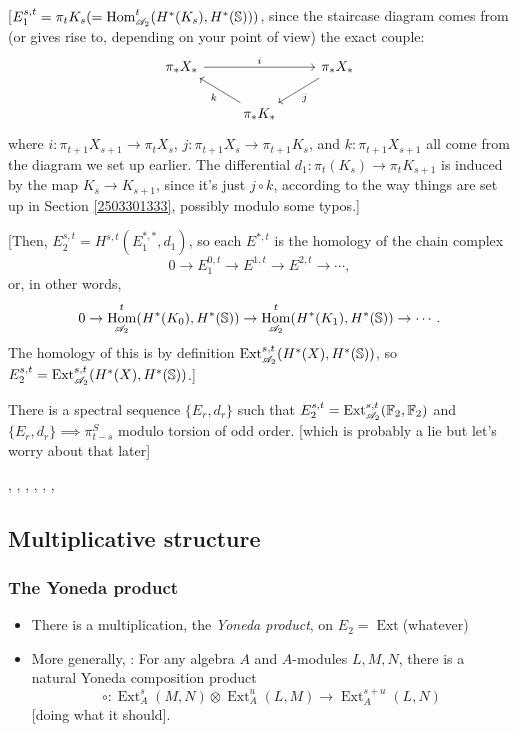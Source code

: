 \documentclass{MetricNotes2023}
\def\bb{\ensuremath\mathbb}
\def\A{\ensuremath{\mathscr{A}_2}}
\DeclareMathOperator{\Ext}{Ext}
\DeclareMathOperator{\Hom}{Hom}
\begin{document}
[\(E_1^{s,t} = \pi_t K_s (=\Hom^t_{\A}(H^*(K_s), H^*(\bb{S})))\), since the staircase diagram comes from (or gives rise to, depending on your point of view) the exact couple:
\[\begin{tikzcd}
 \pi_*X_* \arrow[rr, "i"] & & \pi_* X_* \arrow[dl, "j"] \\ 
 & \pi_*K_* \arrow[ul, "k"] & 
 \end{tikzcd}\]
where \(i : \pi_{t+1}X_{s+1}\to \pi_tX_s\), \(j : \pi_{t+1}X_s \to \pi_{t+1}K_s\), and \(k : \pi_{t+1}X_{s+1}\) all come from the diagram we set up earlier. The differential \(d_1 : \pi_t(K_s)\to\pi_t K_{s+1}\) is induced by the map \(K_s \to K_{s+1}\), since it's just \(j\circ k\), according to the way things are set up in Section \ref{2503301333}, possibly modulo some typos.]

[Then, \(E^{s,t}_2=H^{s,t}(E_1^{*,*}, d_1)\), so each \(E^{*, t}\) is the homology of the chain complex
\[0 \to E^{0,t}_1 \to E^{1,t}\to E^{2,t}\to \cdots,\]
or, in other words,
\[0 \to \Hom^t_{\A}(H^*(K_0), H^*(\bb{S}))\to \Hom^t_{\A}(H^*(K_1), H^*(\bb{S}))\to \cdots.\]
The homology of this is by definition \(\Ext_{\A}^{s,t}(H^*(X), H^*(\bb{S}))\), so \(E_2^{s,t}=\Ext^{s,t}_{\A}(H^*(X), H^*(\bb{S}))\).]

\begin{theorem}
There is a spectral sequence \(\{E_r, d_r\}\) such that \(E_2^{s,t}=\Ext_{\A}^{s,t}(\bb{F}_2, \bb{F}_2)\) and \(\{E_r, d_r\}\implies \pi_{t-s}^S\) modulo torsion of odd order. [which is probably a lie but let's worry about that later]
\end{theorem}



\autocite{spectral_sequences}, \autocite{stable_homotopy}, \autocite{cobordism}, \autocite{foundations}, \autocite{hatcher5}, \autocite{ass}, \autocite{primer}

\subsection{Multiplicative structure}

\subsubsection{The Yoneda product}

\begin{itemize}
\item There is a multiplication, the \textit{Yoneda product}, on \(E_2 = \Ext\)(whatever)
\item More generally, \autocite{rognes2}: For any algebra \(A\) and \(A\)-modules \(L,M,N\), there is a natural Yoneda composition product
\[\circ : \Ext_A^s(M,N)\otimes \Ext^u_A(L,M)\to \Ext_A^{s+u}(L,N)\]
[doing what it should].
\end{itemize}
\end{document}

